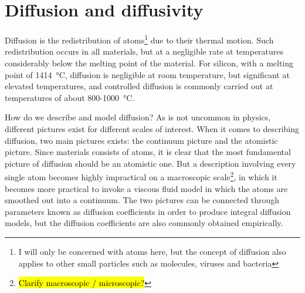 \documentclass[11pt,bibliography=totoc,index=totoc]{scrbook}   %
\newcommand{\comment}[1]{\hl{#1}}
\begin{document}







\section{Diffusion and diffusivity}\label{sec:Diffusion}

Diffusion is the redistribution of atoms\footnote{I will only be concerned with atoms here, but the concept of diffusion also applies to other small particles such as molecules, viruses and bacteria} due to their thermal motion. 
Such redistribution occurs in all materials, but at a negligible rate at temperatures considerably below the melting point of the material.
For silicon, with a melting point of \SI{1414}{\celsius}, diffusion is negligible at room temperature, 
but significant at elevated temperatures, and controlled diffusion is commonly carried out at temperatures 
of about 800-\SI{1000}{\celsius}. 

How do we describe and model diffusion?
As is not uncommon in physics, different pictures exist for different scales of interest. 
When it comes to describing diffusion, two main pictures exists: the continuum picture and the atomistic picture. 
Since materials consists of atoms, it is clear that the most fundamental picture of diffusion should be an atomistic one.
But a description involving every single atom becomes highly impractical on a macroscopic scale\footnote{\comment{Clarify macroscopic / microscopic?}
}, in which it becomes more practical to invoke a viscous fluid model in which the atoms are smoothed out into a continuum.
The two pictures can be connected through parameters known as diffusion coefficients in order to produce integral diffusion models,
but the diffusion coefficients are also commonly obtained empirically.
\end{document}
